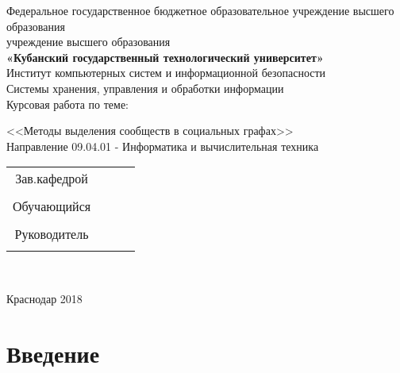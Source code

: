 \documentclass[a4paper]{article}
\begin{document}
 
\begin{center}
\hfill \break

\footnotesize{Федеральное государственное бюджетное образовательное учреждение высшего образования}\\ 
\footnotesize{учреждение высшего образования}\\
\small{\textbf{«Кубанский государственный технологический университет»}}\\
\hfill \break
\small{Институт компьютерных систем и информационной безопасности}\\
 \hfill \break
 \hfill \break
\hfill \break
\large{Системы хранения, управления и обработки информации}\\
\hfill \break
\large{Курсовая работа по теме:}\\
\hfill \break

\normalsize{<<Методы выделения сообществ в социальных графах>>\\
\hfill \break
Направление  09.04.01 - Информатика и вычислительная техника\\
\hfill \break
}
\hfill \break
\hfill \break
\end{center}
 
\hfill \break
\hfill \break
\hfill \break
 
\begin{flushright}
\normalsize{ 
\begin{tabular}{cccc}
Зав.кафедрой & \underline{\hspace{3cm}} & \underline{\hspace{3cm}} \\\\
Обучающийся & \underline{\hspace{3cm}} & \underline{\hspace{3cm}} \\\\
Руководитель & \underline{\hspace{3cm}}& \underline{\hspace{3cm}} \\\\
\end{tabular}
}\\
\end{flushright}


\hfill \break
\hfill \break
\hfill \break
\hfill \break
\hfill \break
\hfill \break

\begin{center} Краснодар 2018 \end{center}
\thispagestyle{empty} %
 
 
\newpage
     
    \tableofcontents %
\newpage
 
\newpage
\section{Введение}
 
 
\end{document}
